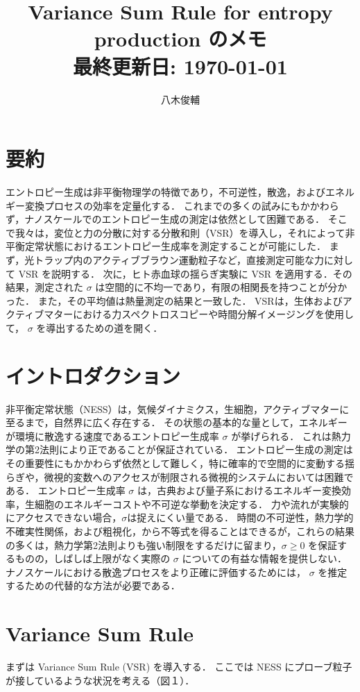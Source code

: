 \documentclass{jsarticle}
\title{{Variance Sum Rule for entropy production のメモ \\[2ex]\large 最終更新日: \today}}
\author{八木俊輔}
\date{}
\numberwithin{equation}{section}
\theoremstyle{definition}
\begin{document}
\maketitle
\tableofcontents
\clearpage

\newpage 
\section{要約}
エントロピー生成は非平衡物理学の特徴であり，不可逆性，散逸，およびエネルギー変換プロセスの効率を定量化する．
これまでの多くの試みにもかかわらず，ナノスケールでのエントロピー生成の測定は依然として困難である．
そこで我々は，変位と力の分散に対する分散和則（VSR）を導入し，それによって非平衡定常状態におけるエントロピー生成率を測定することが可能にした．
まず，光トラップ内のアクティブブラウン運動粒子など，直接測定可能な力に対して VSR を説明する．
次に，ヒト赤血球の揺らぎ実験に VSR を適用する．その結果，測定された $\sigma $ は空間的に不均一であり，有限の相関長を持つことが分かった．
また，その平均値は熱量測定の結果と一致した．
VSRは，生体およびアクティブマターにおける力スペクトロスコピーや時間分解イメージングを使用して， $\sigma $ を導出するための道を開く．

\section{イントロダクション}
非平衡定常状態（NESS）は，気候ダイナミクス，生細胞，アクティブマターに至るまで，自然界に広く存在する．
その状態の基本的な量として，エネルギーが環境に散逸する速度であるエントロピー生成率 $\sigma$ が挙げられる．
これは熱力学の第2法則により正であることが保証されている．
エントロピー生成の測定はその重要性にもかかわらず依然として難しく，特に確率的で空間的に変動する揺らぎや，微視的変数へのアクセスが制限される微視的システムにおいては困難である．
エントロピー生成率 $\sigma $ は，古典および量子系におけるエネルギー変換効率，生細胞のエネルギーコストや不可逆な挙動を決定する．
力や流れが実験的にアクセスできない場合，$\sigma $は捉えにくい量である．
時間の不可逆性，熱力学的不確実性関係，および粗視化，から不等式を得ることはできるが，これらの結果の多くは，熱力学第2法則よりも強い制限をするだけに留まり，$\sigma \geq 0$ を保証するものの，しばしば上限がなく実際の $\sigma$ についての有益な情報を提供しない．
ナノスケールにおける散逸プロセスをより正確に評価するためには， $\sigma $ を推定するための代替的な方法が必要である．

\newpage 
\section{Variance Sum Rule}
まずは Variance Sum Rule (VSR) を導入する．
ここでは NESS にプローブ粒子が接しているような状況を考える（図１）．
\end{document}
